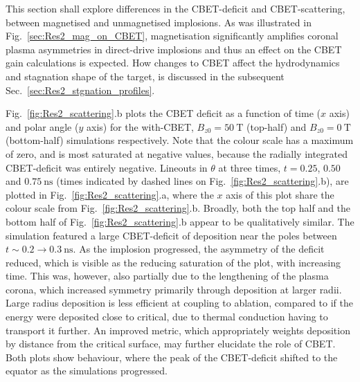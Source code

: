 This section shall explore differences in the \ac{CBET}-deficit and \ac{CBET}-scattering, between magnetised and unmagnetised implosions.
As was illustrated in Fig.~\ref{sec:Res2_mag_on_CBET}, magnetisation significantly amplifies coronal plasma asymmetries in direct-drive implosions and thus an effect on the \ac{CBET} gain calculations is expected.
How changes to \ac{CBET} affect the hydrodynamics and stagnation shape of the target, is discussed in the subsequent Sec.~\ref{sec:Res2_stgnation_profiles}.

Fig.~\ref{fig:Res2_scattering}.b plots the \ac{CBET} deficit as a function of time ($x$ axis) and polar angle ($y$ axis) for the with-\ac{CBET}, $B_{z0}=50\ \text{T}$ (top-half) and $B_{z0}=0\ \text{T}$ (bottom-half) simulations respectively.
Note that the colour scale has a maximum of zero, and is most saturated at negative values, because the radially integrated \ac{CBET}-deficit was entirely negative.
Lineouts in $\theta$ at three times, $t=0.25$, $0.50$ and $0.75\ \text{ns}$ (times indicated by dashed lines on Fig.~\ref{fig:Res2_scattering}.b), are plotted in Fig.~\ref{fig:Res2_scattering}.a, where the $x$ axis of this plot share the colour scale from Fig.~\ref{fig:Res2_scattering}.b.
Broadly, both the top half and the bottom half of Fig.~\ref{fig:Res2_scattering}.b appear to be qualitatively similar.
The simulation featured a large \ac{CBET}-deficit of deposition near the poles between $t\sim0.2\rightarrow0.3\ \text{ns}$.
As the implosion progressed, the asymmetry of the deficit reduced, which is visible as the reducing saturation of the plot, with increasing time.
This was, however, also partially due to the lengthening of the plasma corona, which increased symmetry primarily through deposition at larger radii.
Large radius deposition is less efficient at coupling to ablation, compared to if the energy were deposited close to critical, due to thermal conduction having to transport it further.
An improved metric, which appropriately weights deposition by distance from the critical surface, may further elucidate the role of \ac{CBET}.
Both plots show behaviour, where the peak of the \ac{CBET}-deficit shifted to the equator as the simulations progressed.

